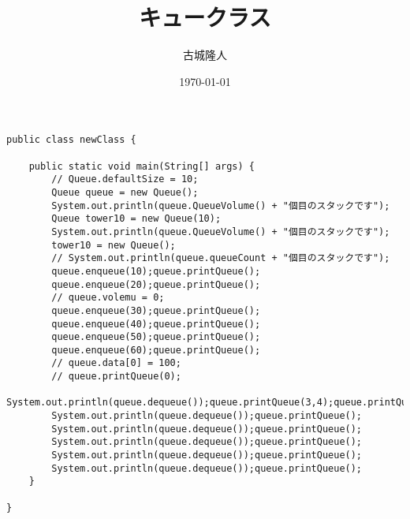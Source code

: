 \documentclass[a4paper,11pt]{ltjsarticle}
\begin{document}
\title{キュークラス}
\author{古城隆人}
\date{\today}
\maketitle
\newpage


\begin{lstlisting}[caption={main class},label={lst:label}]
    public class newClass {

	public static void main(String[] args) {
		// Queue.defaultSize = 10;
		Queue queue = new Queue();
		System.out.println(queue.QueueVolume() + "個目のスタックです");
		Queue tower10 = new Queue(10);
		System.out.println(queue.QueueVolume() + "個目のスタックです");
		tower10 = new Queue();
		// System.out.println(queue.queueCount + "個目のスタックです");
		queue.enqueue(10);queue.printQueue();
		queue.enqueue(20);queue.printQueue();
		// queue.volemu = 0;
		queue.enqueue(30);queue.printQueue();
		queue.enqueue(40);queue.printQueue();
		queue.enqueue(50);queue.printQueue();
		queue.enqueue(60);queue.printQueue();
		// queue.data[0] = 100;
		// queue.printQueue(0);
		System.out.println(queue.dequeue());queue.printQueue(3,4);queue.printQueue();
		System.out.println(queue.dequeue());queue.printQueue();
		System.out.println(queue.dequeue());queue.printQueue();
		System.out.println(queue.dequeue());queue.printQueue();
		System.out.println(queue.dequeue());queue.printQueue();
		System.out.println(queue.dequeue());queue.printQueue();
	}

}
\end{lstlisting}
\end{document}
